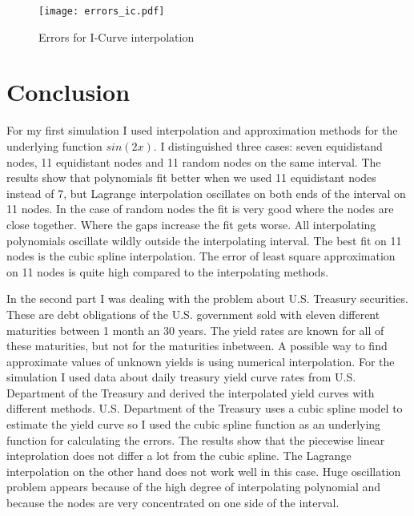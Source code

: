\documentclass[a4paper,10pt]{article}
\begin{document}
\begin{figure}[h!]
\centering
\texttt{[image: errors\_ic.pdf]}
\caption{Errors for I-Curve interpolation}
\label{icerr}
\end{figure}

\section{Conclusion}

For my first simulation I used interpolation and approximation methods for the underlying function $sin(2x)$. 
I distinguished three cases: seven equidistand nodes, 11 equidistant nodes and 11 random nodes on the same interval.
The results show that polynomials fit better when we used 11 equidistant nodes instead of 7, but Lagrange interpolation oscillates on both ends of the interval on 11 nodes.
In the case of random nodes the fit is very good where the nodes are close together. Where the gaps increase the fit gets worse.
All interpolating polynomials oscillate wildly outside the interpolating interval.
The best fit on 11 nodes is the cubic spline interpolation.
The error of least square approximation on 11 nodes is quite high compared to the interpolating methods.

In the second part I was dealing with the problem about U.S. Treasury securities. These are debt obligations of the U.S. government sold with eleven different maturities between 1 month an 30 years.
The yield rates are known for all of these maturities, but not for the maturities inbetween. 
A possible way to find approximate values of unknown yields is using numerical interpolation.
For the simulation I used data about daily treasury yield curve rates from U.S. Department of the Treasury and derived the interpolated yield curves with different methods.
U.S. Department of the Treasury uses a cubic spline model to estimate the yield curve so I used the cubic spline function as an underlying function for calculating the errors.
The results show that the piecewise linear inteprolation does not differ a lot from the cubic spline.
The Lagrange interpolation on the other hand does not work well in this case.
Huge oscillation problem appears because of the high degree of interpolating polynomial and because the nodes are very concentrated on one side of the interval.
\end{document}
